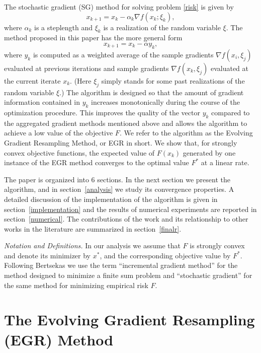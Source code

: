 \documentclass[11pt]{article}
\begin{document}
The stochastic gradient (SG) method for solving problem \eqref{risk} is given by 
\begin{equation}   \label{sgdm}
 x_{k+1} = x_k- \alpha_k  \nabla f(x_k; \xi_k), 
 \end{equation}
where $\alpha_k$ is a steplength and $\xi_k$ is a realization of the random variable $\xi$. The method proposed in this paper has the more general form
\begin{equation}   \label{iteration}
   	 x_{k+1} = x_k  - \alpha  y_k ,
\end{equation}
where $y_k$ is computed as a weighted average of the sample gradients $\nabla f(x_i, \xi_j)$ evaluated at previous iterations and sample gradients $\nabla f(x_k, \xi_j)$ evaluated at the current iterate $x_k$. (Here $\xi_j$ simply stands for some past realizations of the random variable $\xi$.) The algorithm is designed so that the amount of gradient information contained in $y_k$ increases monotonically during the course of the optimization procedure. This improves the quality of the vector $y_k$ compared to the aggregated gradient methods mentioned above and allows the algorithm to achieve a low  value of the objective $F$. We refer to the algorithm as the Evolving Gradient Resampling Method, or EGR in short. We show that, for strongly convex objective functions, the expected value of $F(x_k)$ generated by one instance of the EGR method converges to the optimal value  $F^\ast$ at a linear rate.

The paper is organized into 6 sections. In the next section we present the algorithm, and in section~\ref{analysis} we study its convergence properties. A detailed discussion of the implementation of the algorithm is given in section~\ref{implementation} and the results of numerical experiments are reported in section~\ref{numerical}. The contributions of the work and its relationship to other works in the literature are summarized in section~\ref{finalr}.

\bigskip\noindent
\textit{Notation and Definitions.} In our analysis we assume that $F$ is strongly convex and denote its minimizer by $x^\ast$, and the corresponding objective value by $F^\ast$.  Following Bertsekas \cite{bertsekas2011incremental} we use the  term ``incremental gradient method''  for the method designed to minimize a finite sum problem and  ``stochastic gradient'' for the same method for minimizing empirical risk $F$.



\section{The Evolving Gradient Resampling (EGR) Method}  \label{themethod}
\setcounter{equation}{0}
\end{document}
